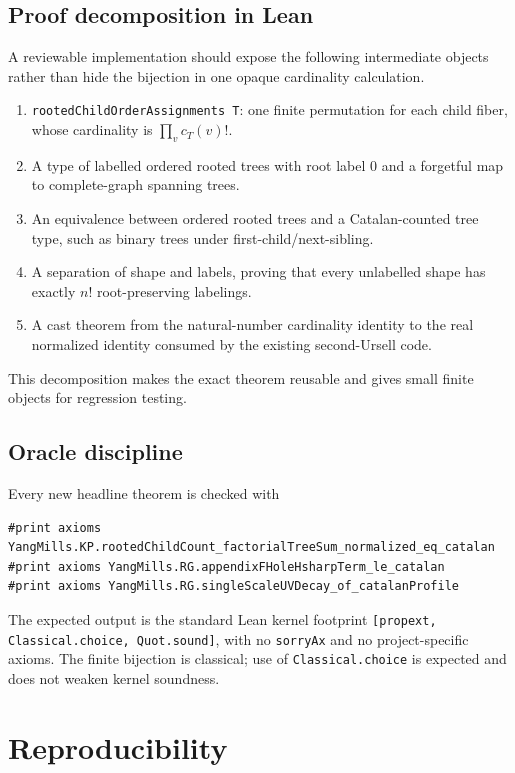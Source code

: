 \documentclass[11pt,a4paper]{article}
\theoremstyle{definition}
\begin{document}
\subsection{Proof decomposition in Lean}

A reviewable implementation should expose the following intermediate objects rather than
hide the bijection in one opaque cardinality calculation.
\begin{enumerate}
\item \texttt{rootedChildOrderAssignments T}: one finite permutation for each child
      fiber, whose cardinality is $\prod_v c_T(v)!$.
\item A type of labelled ordered rooted trees with root label $0$ and a forgetful map to
      complete-graph spanning trees.
\item An equivalence between ordered rooted trees and a Catalan-counted tree type, such
      as binary trees under first-child/next-sibling.
\item A separation of shape and labels, proving that every unlabelled shape has exactly
      $n!$ root-preserving labelings.
\item A cast theorem from the natural-number cardinality identity to the real normalized
      identity consumed by the existing second-Ursell code.
\end{enumerate}
This decomposition makes the exact theorem reusable and gives small finite objects for
regression testing.

\subsection{Oracle discipline}

Every new headline theorem is checked with
\begin{lstlisting}
#print axioms YangMills.KP.rootedChildCount_factorialTreeSum_normalized_eq_catalan
#print axioms YangMills.RG.appendixFHoleHsharpTerm_le_catalan
#print axioms YangMills.RG.singleScaleUVDecay_of_catalanProfile
\end{lstlisting}
The expected output is the standard Lean kernel footprint
\texttt{[propext, Classical.choice, Quot.sound]}, with no \texttt{sorryAx} and no
project-specific axioms.  The finite bijection is classical; use of
\texttt{Classical.choice} is expected and does not weaken kernel soundness.

\section{Reproducibility}
\label{sec:repro}
\end{document}
